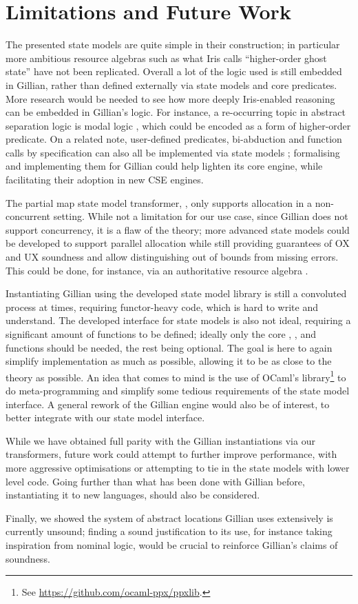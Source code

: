 \section{Limitations and Future Work}

The presented state models are quite simple in their construction; in particular more ambitious resource algebras such as what Iris calls ``higher-order ghost state'' \cite{iris} have not been replicated. Overall a lot of the logic used is still embedded in Gillian, rather than defined externally via state models and core predicates. More research would be needed to see how more deeply Iris-enabled reasoning can be embedded in Gillian's logic. For instance, a re-occurring topic in abstract separation logic is modal logic \cite{higherorderseplogic,iris,statesoundness}, which could be encoded as a form of higher-order predicate. On a related note, user-defined predicates, bi-abduction and function calls by specification can also all be implemented via state models \cite{sacha-phd}; formalising and implementing them for Gillian could help lighten its core engine, while facilitating their adoption in new CSE engines.

The partial map state model transformer, \PMap, only supports allocation in a non-concurrent setting. While not a limitation for our use case, since Gillian does not support concurrency, it is a flaw of the theory; more advanced state models could be developed to support parallel allocation while still providing guarantees of OX and UX soundness and allow distinguishing out of bounds from missing errors. This could be done, for instance, via an authoritative resource algebra \cite{iris}.

Instantiating Gillian using the developed state model library is still a convoluted process at times, requiring functor-heavy code, which is hard to write and understand. The developed interface for state models is also not ideal, requiring a significant amount of functions to be defined; ideally only the core \execac, \consume, \produce{} and \fix{} functions should be needed, the rest being optional. The goal is here to again simplify implementation as much as possible, allowing it to be as close to the theory as possible. An idea that comes to mind is the use of OCaml's  library\footnote{See \url{https://github.com/ocaml-ppx/ppxlib}.} to do meta-programming and simplify some tedious requirements of the state model interface. A general rework of the Gillian engine would also be of interest, to better integrate with our state model interface.

While we have obtained full parity with the Gillian instantiations via our transformers, future work could attempt to further improve performance, with more aggressive optimisations or attempting to tie in the state models with lower level code. Going further than what has been done with Gillian before, instantiating it to new languages, should also be considered.

Finally, we showed the system of abstract locations Gillian uses extensively is currently unsound; finding a sound justification to its use, for instance taking inspiration from nominal logic, would be crucial to reinforce Gillian's claims of soundness.
